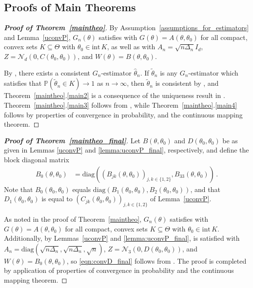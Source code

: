 \documentclass[11pt,a4paper]{article}
\newcommand{\thetan}{{\theta_0}}
\newcommand{\PP}{{\mathbb P}}
\newcommand{\nn}{{\mathcal{N}}}
\numberwithin{equation}{section}
\numberwithin{theorem}{section}
\begin{document}
\subsection{Proofs of Main Theorems}
\label{section_proofofmaintheorem_jump}
%
\begin{proof}[\textbf{Proof of Theorem~\ref{maintheo}}]
  By Assumption~\ref{assumptions_for_estimators} and Lemma~\ref{uconvP}, $G_n(\theta)$ satisfies \cite[Condition $2.2$]{jacod2018} with $G(\theta) = A(\theta,\thetan)$ for all compact, convex sets $K\subseteq \Theta$ with $\theta_0 \in \text{int}\, K$, as well as \cite[Condition $2.10$]{jacod2018} with $A_n = \sqrt{n\Delta_n}I_d$, $Z = \nn_d(0,C(\theta_0, \thetan))$, and $W(\theta) = B(\theta,\thetan)$.
  \medskip

  By \cite[Theorem $2.5$]{jacod2018}, there exists a consistent $G_n$-estimator $\hat{\theta}_n$. 
%
  If $\tilde{\theta}_n$ is any $G_n$-estimator which satisfies that $\PP( \tilde{\theta}_n \in K) \to 1$ as $n\to \infty$, then $\tilde{\theta}_n$ is consistent by \cite[Theorem $2.7.(1)$]{jacod2018}, and  Theorem~\ref{maintheo}.\ref{main2} is a consequence of the uniqueness result in \cite[Theorem $2.5$]{jacod2018}. Theorem~\ref{maintheo}.\ref{main3} follows from \cite[Theorem $2.11$]{jacod2018}, while Theorem~\ref{maintheo}.\ref{main4} follows by properties of convergence in probability, and the continuous mapping theorem.
\end{proof}
%
\begin{proof}[\textbf{Proof of Theorem~\ref{maintheo_final}}]
Let $B(\theta, \thetan)$ and $D(\thetan, \thetan)$ be as given in Lemmas \ref{uconvP} and \ref{lemma:uconvP_final}, respectively, and define the block diagonal matrix
  \begin{align*}
    B_0(\theta, \thetan) &= \text{diag}((B_{jk}(\theta, \thetan))_{j,k \in \{1,2\}}, B_{33}(\theta, \thetan))\,.
  \end{align*}
  Note that $B_0(\thetan, \thetan)$ equals $\text{diag}(B_1(\thetan, \thetan), B_2(\thetan, \thetan))$, and that $D_1(\thetan, \thetan)$ is equal to $(C_{jk}(\thetan, \thetan))_{j,k \in \{1,2\}}$ of Lemma~\ref{uconvP}.
  \medskip

  As noted in the proof of Theorem~\ref{maintheo}, $G_n(\theta)$ satisfies \cite[Condition $2.2$]{jacod2018} with $G(\theta) = A(\theta,\thetan)$ for all compact, convex sets $K\subseteq \Theta$ with $\theta_0 \in \text{int}\, K$. Additionally, by Lemmas~\ref{uconvP} and \ref{lemma:uconvP_final}, \cite[Condition $2.10$]{jacod2018} is satisfied with $A_n = \textrm{diag}(\sqrt{n\Delta_n}, \sqrt{n\Delta_n}, \sqrt{n})$, $Z = \nn_3(0,D(\theta_0, \thetan))$, and $W(\theta) = B_0(\theta,\thetan)$, so \eqref{eqn:convD_final} follows from \cite[Theorem $2.11$]{jacod2018}. The proof is completed by application of properties of convergence in probability and the continuous mapping theorem. 
\end{proof}
\end{document}
